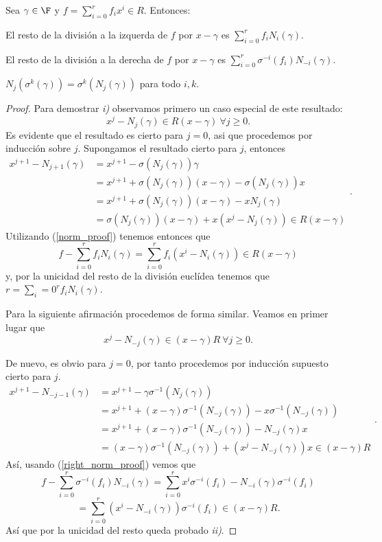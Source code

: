 \begin{lemma}
    Sea \(\gamma \in \F\) y  \(f = \sum_{i=0}^r f_ix^i \in R\). Entonces:
    \begin{nlist}
    \item El resto de la división a la izquerda de \(f\) por  \(x - \gamma\) es  \(\sum_{i=0}^{r} f_i N_i(\gamma)\).
    \item El resto de la división a la derecha de \(f\) por  \(x - \gamma\) es  \(\sum_{i=0}^{r}\sigma^{-i}(f_i)N_{-i}(\gamma)\).
    \item \(N_j(\sigma^k(\gamma)) = \sigma^k(N_j(\gamma))\) para todo \(i,k\).
    \end{nlist}
\end{lemma}
\begin{proof}
    Para demostrar \textit{i)} observamos primero un caso especial de este resultado:
\begin{equation}
\label{norm_proof}
    x^j - N_j(\gamma) \in R(x-\gamma)\ \forall j \geq 0.
\end{equation}
    Es evidente que el resultado es cierto para \(j = 0\), asi que procedemos por inducción sobre \(j\). Supongamos el resultado cierto para \(j\), entonces
\[
\begin{aligned}
x^{j+1} - N_{j+1}(\gamma) &= x^{j+1} - \sigma(N_j(\gamma))\gamma \\
&= x^{j+1} +  \sigma(N_j(\gamma))(x-\gamma) - \sigma(N_j(\gamma))x \\
&= x^{j+1} +  \sigma(N_j(\gamma))(x-\gamma) - xN_j(\gamma) \\
&= \sigma(N_j(\gamma))(x-\gamma) + x(x^{j} - N_j(\gamma)) \in R(x-\gamma)
\end{aligned}
.\]
Utilizando (\ref{norm_proof}) tenemos entonces que
\[
f - \sum_{i=0}^r f_i N_i(\gamma) = \sum_{i=0}^r f_i(x^i - N_i(\gamma)) \in R(x - \gamma)
\]
y, por la unicidad del resto de la división euclídea tenemos que \(r = \sum_i=0^r f_i N_i(\gamma)\).

Para la siguiente afirmación procedemos de forma similar. Veamos en primer lugar que
\begin{equation}
\label{right_norm_proof}
    x^j - N_{-j}(\gamma) \in (x-\gamma)R\ \forall j \geq 0.
\end{equation}

De nuevo, es obvio para \(j = 0\), por tanto procedemos por inducción supuesto cierto para \(j\).
\[
\begin{aligned}
x^{j+1} - N_{-j-1}(\gamma) &= x^{j+1} - \gamma\sigma^{-1}(N_j(\gamma))  \\
&= x^{j+1} +  (x-\gamma)\sigma^{-1}(N_{-j}(\gamma)) - x\sigma^{-1}(N_{-j}(\gamma)) \\
&= x^{j+1} + (x-\gamma)\sigma^{-1}(N_{-j}(\gamma)) - N_{-j}(\gamma)x \\
&= (x-\gamma)\sigma^{-1}(N_{-j}(\gamma)) + (x^{j} - N_{-j}(\gamma))x \in (x-\gamma)R
\end{aligned}
.\]
Así, usando (\ref{right_norm_proof}) vemos que
\[
f - \sum_{i=0}^r \sigma^{-i}(f_i) N_{-i}(\gamma) = \sum_{i=0}^r x^i\sigma^{-i}(f_i) - N_{-i}(\gamma)\sigma^{-i}(f_i)
\]
\[
= \sum_{i=0}^r (x^i - N_{-i}(\gamma))\sigma^{-i}(f_i) \in (x - \gamma)R
.\]
Así que por la unicidad del resto queda probado \textit{ii)}.


\end{proof}
